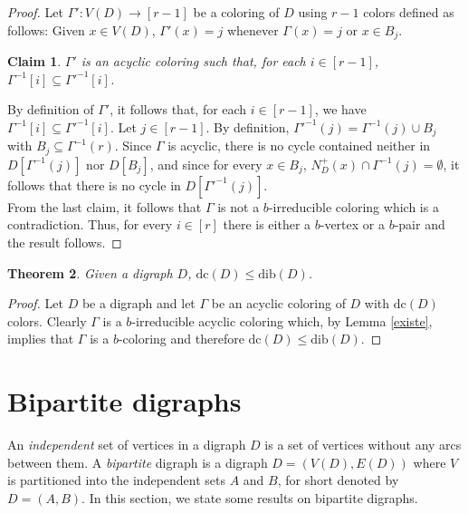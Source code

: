 \documentclass[12pt]{article}
\newtheorem{theorem}{Theorem}
\newtheorem{claim}[theorem]{Claim}
\begin{document}
\begin{proof}
 Let $\Gamma':V(D)\rightarrow [r-1]$ be a coloring of $D$ using $r-1$ colors defined as follows: Given $x\in V(D)$, $\Gamma'(x) = j$ whenever $\Gamma(x) = j$ or $x\in B_j$. 
 
\begin{claim} $\Gamma'$ is an acyclic coloring such that, for each $i\in [r-1]$, $\Gamma^{-1}[i]\subseteq \Gamma'^{-1}[i]$. \end{claim}
 
 \noindent By definition of $\Gamma'$, it follows that, for each $i\in [r-1]$, we have $\Gamma^{-1}[i]\subseteq \Gamma'^{-1}[i]$. Let $j\in[r-1]$. By definition, $\Gamma'^{-1}(j)= \Gamma^{-1}(j)\cup B_j$ with $B_j\subseteq \Gamma^{-1}(r)$. Since $\Gamma$ is acyclic, there is no cycle contained neither in $D[\Gamma^{-1}(j)]$ nor $D[B_j]$, and since for every $x\in B_j$, $N_D^+(x)\cap \Gamma^{-1}(j) = \emptyset$, it follows that there is no cycle in $D[\Gamma'^{-1}(j)]$. \\

From the last claim, it follows that $\Gamma$ is not a $b$-irreducible coloring which is a contradiction. Thus, for every $i\in [r]$ there is either a $b$-vertex or a $b$-pair and the result follows. \end{proof}

\begin{theorem}
Given a digraph $D$, $\text{dc}(D) \leq \text{dib}(D)$. 
\end{theorem}
 \begin{proof}
 Let $D$ be a digraph and let $\Gamma$ be an acyclic coloring of $D$ with $\text{dc}(D)$ colors. Clearly $\Gamma$ is a $b$-irreducible acyclic coloring which, by Lemma \ref{existe}, implies that $\Gamma$ is a $b$-coloring and therefore $\text{dc}(D) \leq \text{dib}(D)$. \end{proof}

\def\di #1{\overrightarrow{#1}}


\section{Bipartite digraphs}

An \textit{independent} set of vertices in a digraph $D$ is a set of vertices without any arcs between them. A \emph{bipartite} digraph is a digraph $D=(V(D),E(D))$ where $V$ is partitioned into the independent sets $A$ and $B$, for short denoted by $D=(A,B)$. In this section, we state some results on bipartite digraphs.
 
\end{document}

